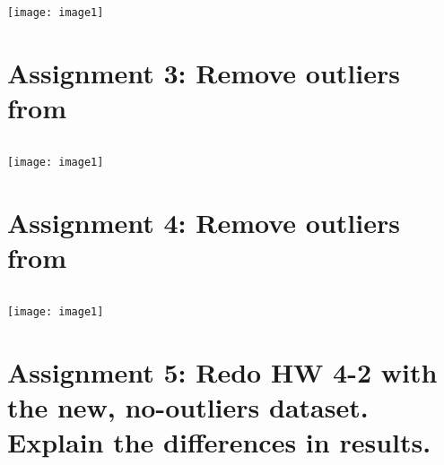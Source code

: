 \documentclass[]{article}
\begin{document}
\begin{verbatim}
\end{verbatim}
\texttt{[image: image1]}


\section*{Assignment 3: Remove outliers from }

\begin{verbatim}
\end{verbatim}
\texttt{[image: image1]}


\section*{Assignment 4: Remove outliers from }

\begin{verbatim}
\end{verbatim}
\texttt{[image: image1]}




\section*{Assignment 5: Redo HW 4-2 with the new, no-outliers dataset. Explain the differences in results.}
\end{document}
